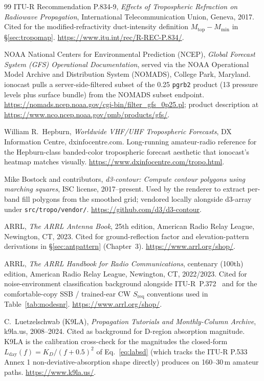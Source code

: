 \documentclass[11pt,a4paper]{article}
\begin{document}
\begin{thebibliography}{99}
  ITU-R Recommendation P.834-9,
  \emph{Effects of Tropospheric Refraction on Radiowave Propagation},
  International Telecommunication Union, Geneva, 2017.
  Cited for the modified-refractivity duct-intensity definition
  $M_{\text{top}} - M_{\text{min}}$ in \S\ref{sec:tropomap}.
  \url{https://www.itu.int/rec/R-REC-P.834/}.

  NOAA National Centers for Environmental Prediction (NCEP),
  \emph{Global Forecast System (GFS) Operational Documentation},
  served via the NOAA Operational Model Archive and Distribution
  System (NOMADS), College Park, Maryland.  ionocast pulls a
  server-side-filtered subset of the 0.25\textdegree{}
  \texttt{pgrb2} product (13 pressure levels plus surface bundle)
  from the NOMADS subset endpoint.
  \url{https://nomads.ncep.noaa.gov/cgi-bin/filter_gfs_0p25.pl};
  product description at
  \url{https://www.nco.ncep.noaa.gov/pmb/products/gfs/}.

  William R.\ Hepburn,
  \emph{Worldwide VHF/UHF Tropospheric Forecasts},
  DX Information Centre, dxinfocentre.com.  Long-running
  amateur-radio reference for the Hepburn-class banded-color
  tropospheric forecast aesthetic that ionocast's heatmap matches
  visually.
  \url{https://www.dxinfocentre.com/tropo.html}.

  Mike Bostock and contributors,
  \emph{d3-contour: Compute contour polygons using marching
  squares},
  ISC license, 2017--present.  Used by the renderer to extract
  per-band fill polygons from the smoothed grid; vendored locally
  alongside d3-array under \texttt{src/tropo/vendor/}.
  \url{https://github.com/d3/d3-contour}.

  ARRL,
  \emph{The ARRL Antenna Book}, 25th edition,
  American Radio Relay League, Newington, CT, 2023.
  Cited for ground-reflection factor and elevation-pattern
  derivations in \S\ref{sec:antpattern} (Chapter~3).
  \url{https://www.arrl.org/shop/}.

  ARRL,
  \emph{The ARRL Handbook for Radio Communications},
  centenary (100th) edition,
  American Radio Relay League, Newington, CT, 2022/2023.
  Cited for noise-environment classification background
  alongside ITU-R~P.372~\cite{itup372} and for the
  comfortable-copy SSB / trained-ear CW $S_{\text{req}}$
  conventions used in Table~\ref{tab:modesnr}.
  \url{https://www.arrl.org/shop/}.

  C.~Luetzelschwab (K9LA),
  \emph{Propagation Tutorials and Monthly-Column Archive},
  k9la.us, 2008--2024.
  Cited as background for D-region absorption magnitude.
  K9LA is
  the calibration cross-check for the magnitudes the closed-form
  $L_{\text{day}}(f) = K_D / (f + 0.5)^{2}$ of
  Eq.~\ref{eq:labsd} (which tracks the ITU-R P.533~\cite{itup533}
  Annex 1 non-deviative-absorption shape directly)
  produces on 160--30\,m amateur paths.
  \url{https://www.k9la.us/}.


\end{thebibliography}
\end{document}
